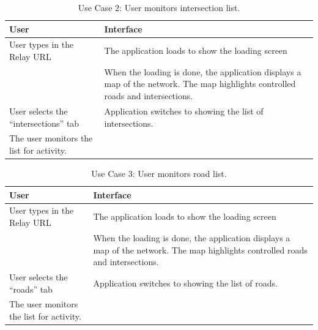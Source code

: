 \documentclass{report}
\begin{document}
\begin{table}[htbp]
\begin{centering}
    \begin{tabular}{| p{7cm} | p{7cm} |}
    \hline
    User    & Interface   \\ \hline
    User types in the Relay URL    &     The application loads to show the loading screen    \\ \hline
    ~      & When the loading is done, the application displays a map of the network. The map highlights controlled roads and intersections. \\ \hline
     User selects the ``intersections'' tab  &    Application switches to showing the list of intersections.          \\ \hline
    The user monitors the list for activity.   &    \\ \hline
    \end{tabular}
    \caption {Use Case 2: User monitors intersection list.}
    \label{use-case-2}
   \end{centering}
\end{table}

\begin{table}[htbp]
\begin{centering}
    \begin{tabular}{| p{7cm} | p{7cm} |}
    \hline
    User    & Interface   \\ \hline
    User types in the Relay URL    &     The application loads to show the loading screen    \\ \hline
    ~      & When the loading is done, the application displays a map of the network. The map highlights controlled roads and intersections. \\ \hline
     User selects the ``roads'' tab  &    Application switches to showing the list of roads.          \\ \hline
    The user monitors the list for activity.   &    \\ \hline
    \end{tabular}
    \caption {Use Case 3: User monitors road list.}
    \label{use-case-3}
   \end{centering}
\end{table}
\end{document}
